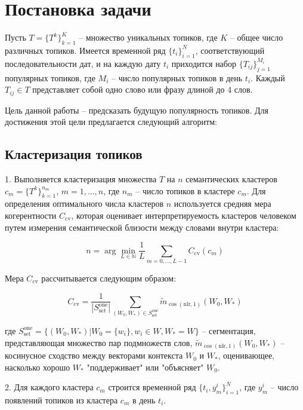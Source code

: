 \section{Постановка задачи}

Пусть $T = \{T^k\}_{k=1}^K$ -- множество уникальных топиков, где $K$ -- общее число различных топиков. Имеется временной ряд $\{t_i\}_{i=1}^N$, соответствующий последовательности дат, и на каждую дату $t_i$ приходится набор $\{T_{ij}\}_{j=1}^{M_i}$ популярных топиков, где $M_i$ -- число популярных топиков в день $t_i$. Каждый $T_{ij} \in T$ представляет собой одно слово или фразу длиной до 4 слов.

Цель данной работы -- предсказать будущую популярность топиков. Для достижения этой цели предлагается следующий алгоритм:

\subsection{Кластеризация топиков}

1. Выполняется кластеризация множества $T$ на $n$ семантических кластеров $c_m = \{T^k\}_{k=1}^{n_m}$, $m = 1, \ldots, n$, где $n_m$ -- число топиков в кластере $c_m$. Для определения оптимального числа кластеров $n$ используется средняя мера когерентности $C_{\text{cv}}$, которая оценивает интерпретируемость кластеров человеком путем измерения семантической близости между словами внутри кластера:

\begin{equation}
n = \arg\min_{L \in \mathbb{N}} \frac{1}{L} \sum_{m=0,...,L-1} C_{\text{cv}}(c_m)
\end{equation}


Мера $C_{\text{cv}}$ рассчитывается следующим образом:

\begin{equation}
C_{\text{cv}} = \frac{1}{|S^{\text{one}}_{\text{set}}|} \sum_{(W_0, W_*) \in S^{\text{one}}_{\text{set}}} \tilde{m}_{\cos(\text{nlr}, 1)}(W_0, W_*)
\end{equation}

где $S^{\text{one}}_{\text{set}} = \{(W_0, W_*) | W_0 = \{w_i\}, w_i \in W, W_* = W\}$ -- сегментация, представляющая множество пар подмножеств слов, $\tilde{m}_{\cos(\text{nlr}, 1)}(W_0, W_*)$ -- косинусное сходство между векторами контекста $W_0$ и $W_*$, оценивающее, насколько хорошо $W_*$ "поддерживает" или "объясняет" $W_0$.

2. Для каждого кластера $c_m$ строится временной ряд $\{t_i, y_m^i\}_{i=1}^N$, где $y_m^i$ -- число появлений топиков из кластера $c_m$ в день $t_i$.

